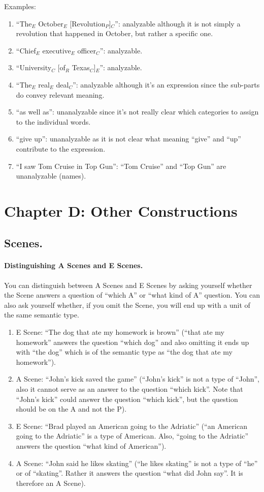 \documentclass[11pt]{article}
\newcommand{\be}{\begin{enumerate}}
\newcommand{\ee}{\end{enumerate}}
\begin{document}
Examples:

\begin{enumerate}
\item
``The$_E$ October$_E$ [Revolution$_P$]$_C$'': analyzable although it is not
simply a revolution that happened in October, but rather a specific one.
\item
``Chief$_E$ executive$_E$ officer$_C$'': analyzable.
\item
``University$_C$ [of$_R$ Texas$_C$]$_E$'': analyzable.
\item
``The$_E$ real$_E$ deal$_C$'': analyzable although it's an expression
since the sub-parts do convey relevant meaning.
\item
``as well as'': unanalyzable since it's not really clear which
categories to assign to the individual words.
\item
``give up'': unanalyzable as it is not clear what meaning ``give'' and ``up'' contribute to the expression.
\item
``I saw Tom Cruise in Top Gun'': ``Tom Cruise'' and ``Top Gun'' are unanalyzable (names).
\end{enumerate}


\section{\large Chapter D: Other Constructions}


\subsection{Scenes.}

\paragraph{Distinguishing A Scenes and E Scenes.} You can distinguish between A Scenes
and E Scenes by asking yourself whether the Scene answers a question of
``which A'' or ``what kind of A'' question. You can also ask yourself whether,
if you omit the Scene, you will end up with a unit of the same semantic
type.
\be
\item
E Scene: ``The dog that ate my homework is brown'' (``that ate my homework''
answers the question ``which dog'' and also omitting it ends up with ``the
dog'' which is of the semantic type as ``the dog that ate my homework'').
\item
A Scene: ``John's kick saved the game'' (``John's kick'' is not a type of
``John'', also it cannot serve as an answer to the question ``which kick''.
Note that ``John's kick'' could answer the question ``which kick'', but the
question should be on the A and not the P).
\item
E Scene: ``Brad played an American going to the Adriatic'' (``an American
going to the Adriatic'' is a type of American. Also, ``going to the Adriatic''
answers the question ``what kind of American'').
\item
A Scene: ``John said he likes skating'' (``he likes skating'' is not a type of
``he'' or of ``skating''. Rather it answers the question ``what did John say''.
It is therefore an A Scene).
\ee
\end{document}
